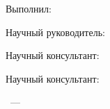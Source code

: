 \begin{flushright}%

Выполнил:

\MeFio
\end{flushright}%

\begin{flushright}%
Научный руководитель:

\supervisorRegalia

\supervisorFio
\end{flushright}%

\begin{flushright}%
Научный консультант:

\supervisorRegalia

\supervisorFioAlex
\end{flushright}%

\begin{flushright}%
Научный консультант:

\supervisorRegalia

\supervisorFioMax
\end{flushright}%

%
\vspace{0pt plus4fill} %
\begin{center}%
{\thesisCity~--- \thesisYear}
\end{center}%
\newpage
